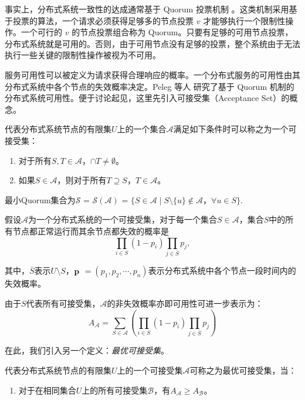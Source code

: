 事实上，分布式系统一致性的达成通常基于 Quorum 投票机制 \cite{Gifford:1979:WVR:800215.806583}。这类机制采用基于投票的算法，一个请求必须获得足够多的节点投票 $v$ 才能够执行一个限制性操作。一个可行的 $v$ 的节点投票组合称为 Quorum。只要有足够的可用节点投票，分布式系统就是可用的。否则，由于可用节点没有足够的投票，整个系统由于无法执行一些关键的限制性操作被视为不可用。

服务可用性可以被定义为请求获得合理响应的概率。一个分布式服务的可用性由其分布式系统中各个节点的失效概率决定。Peleg 等人 \cite{Peleg1995210} 研究了基于 Quorum 机制的分布式系统可用性。便于讨论起见，这里先引入可接受集（Acceptance Set）的概念\cite{Amir1998223}。

\begin{definition}
代表分布式系统节点的有限集$U$上的一个集合$\mathcal{A}$满足如下条件时可以称之为一个可接受集：
\begin{enumerate}[1)]
\item 对于所有$S, T \in \mathcal{A}$，$\cap T \neq \emptyset$。
\item 如果$S \in \mathcal{A}$，则对于所有$T \supseteq S$，$T \in \mathcal{A}$。
\end{enumerate}
最小Quorum集合为$\mathcal{S}$ = $\mathcal{S}(\mathcal{A})$ = $\{S \in \mathcal{A} \mid S \setminus \{u\} \notin \mathcal{A}$，$\forall u \in S\}$.
\end{definition}

假设$\mathcal{A}$为一个分布式系统的一个可接受集，对于每一个集合$S \in \mathcal{A}$，集合$S$中的所有节点都正常运行而其余节点都失效的概率是
\begin{equation}\nonumber
\prod_{i \in S} (1-p_i) \prod_{j \in \overline S} p_j,
\end{equation}

其中，$\overline S$表示$U \setminus S$，$\bf p$ $= (p_1, p_2, \cdots, p_n)$表示分布式系统中各个节点一段时间内的失效概率。

由于$S$代表所有可接受集，$\mathcal{A}$的非失效概率亦即可用性可进一步表示为：
\begin{equation}\label{eq_a_as}
A_{\mathcal{A}} = \sum_{S \in \mathcal{A}}(\prod_{i \in S} (1-p_i) \prod_{j \in \overline S} p_j)
\end{equation}

在此，我们引入另一个定义：\emph{最优可接受集}。
\begin{definition}
代表分布式系统节点的有限集$U$上的一个可接受集$\mathcal{A}$可称之为最优可接受集，当：
\begin{enumerate}[1)]
\item 对于在相同集合$U$上的所有可接受集$\mathcal{B}$，有$A_{\mathcal{A}} \geq A_{\mathcal{B}}$。
\end{enumerate}
\end{definition}

